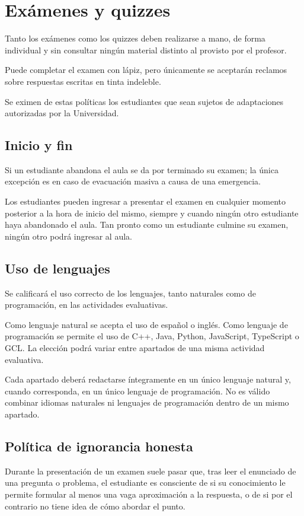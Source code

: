 \section{Exámenes y quizzes}
Tanto los exámenes como los quizzes deben realizarse a mano, de forma individual y sin consultar ningún material distinto al provisto por el profesor.

Puede completar el examen con lápiz, pero únicamente se aceptarán reclamos sobre respuestas escritas en tinta indeleble.

Se eximen de estas políticas los estudiantes que sean sujetos de adaptaciones autorizadas por la Universidad.

\subsection{Inicio y fin}
Si un estudiante abandona el aula se da por terminado su examen; la única excepción es en caso de evacuación masiva a causa de una emergencia.

Los estudiantes pueden ingresar a presentar el examen en cualquier momento posterior a la hora de inicio del mismo, siempre y cuando ningún otro estudiante haya abandonado el aula. Tan pronto como un estudiante culmine su examen, ningún otro podrá ingresar al aula.

\subsection{Uso de lenguajes}
Se calificará el uso correcto de los lenguajes, tanto naturales como de programación, en las actividades evaluativas.

Como lenguaje natural se acepta el uso de español o inglés. Como lenguaje de programación se permite el uso de C++, Java, Python, JavaScript, TypeScript o GCL. La elección podrá variar entre apartados de una misma actividad evaluativa.

Cada apartado deberá redactarse íntegramente en un único lenguaje natural y, cuando corresponda, en un único lenguaje de programación. No es válido combinar idiomas naturales ni lenguajes de programación dentro de un mismo apartado.

\subsection{Política de ignorancia honesta}
Durante la presentación de un examen suele pasar que, tras leer el enunciado de una pregunta o problema, el estudiante es consciente de si su conocimiento le permite formular al menos una vaga aproximación a la respuesta, o de si por el contrario no tiene idea de cómo abordar el punto.

